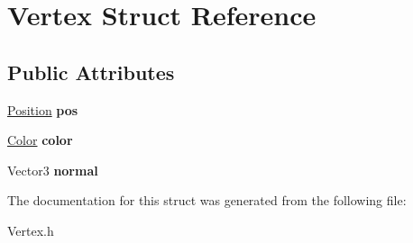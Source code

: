 \hypertarget{struct_vertex}{\section{Vertex Struct Reference}
\label{struct_vertex}
}
\subsection*{Public Attributes}
\begin{DoxyCompactItemize}
\item 
\hypertarget{struct_vertex_a8791e77df49f6996a19a8dd17cee8d5c}{\hyperlink{struct_position}{Position} {\bfseries pos}}\label{struct_vertex_a8791e77df49f6996a19a8dd17cee8d5c}

\item 
\hypertarget{struct_vertex_a3a3ff3f6cf46b1848795991e8159b922}{\hyperlink{struct_color}{Color} {\bfseries color}}\label{struct_vertex_a3a3ff3f6cf46b1848795991e8159b922}

\item 
\hypertarget{struct_vertex_adce2d4b3d1191c69328519bdf231c344}{Vector3 {\bfseries normal}}\label{struct_vertex_adce2d4b3d1191c69328519bdf231c344}

\end{DoxyCompactItemize}


The documentation for this struct was generated from the following file\+:\begin{DoxyCompactItemize}
\item 
Vertex.\+h\end{DoxyCompactItemize}
